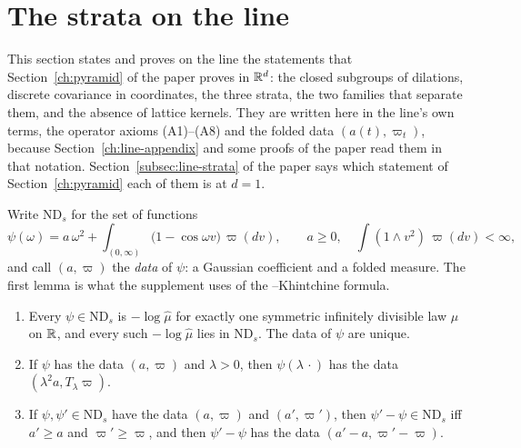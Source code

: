 \section{The strata on the line}
\label{supp:strata}

This section states and proves on the line the statements that Section~\ref{ch:pyramid} of the
paper proves in $\mathbb{R}^d$: the closed subgroups of dilations, discrete covariance in \Levy{}
coordinates, the three strata, the two families that separate them, and the absence of lattice
kernels. They are written here in the line's own terms, the operator axioms (A1)--(A8) and the
folded data $(a(t), \varpi_t)$, because Section~\ref{ch:line-appendix} and some proofs of the paper
read them in that notation. Section~\ref{subsec:line-strata} of the paper says which statement of
Section~\ref{ch:pyramid} each of them is at $d = 1$.

Write $\mathrm{ND}_s$ for the set of functions
\[
  \psi(\omega) = a\,\omega^2 + \int_{(0,\infty)}\bigl(1 - \cos\omega v\bigr)\,\varpi(dv), \qquad
  a \ge 0, \quad \int(1 \wedge v^2)\,\varpi(dv) < \infty ,
\]
and call $(a, \varpi)$ the \emph{data} of $\psi$: a Gaussian coefficient and a folded \Levy{}
measure. The first lemma is what the supplement uses of the \Levy{}--Khintchine formula.

\begin{lemma}
\label{lem:line-exponent-data}

\begin{enumerate}
\item Every $\psi \in \mathrm{ND}_s$ is $-\log\widehat\mu$ for exactly one symmetric infinitely
divisible law $\mu$ on $\mathbb{R}$, and every such $-\log\widehat\mu$ lies in $\mathrm{ND}_s$. The data of
$\psi$ are unique.
\item If $\psi$ has the data $(a, \varpi)$ and $\lambda > 0$, then $\psi(\lambda\,\cdot)$ has the
data $(\lambda^2a, T_\lambda\varpi)$.
\item If $\psi, \psi' \in \mathrm{ND}_s$ have the data $(a, \varpi)$ and $(a', \varpi')$, then
$\psi' - \psi \in \mathrm{ND}_s$ iff $a' \ge a$ and $\varpi' \ge \varpi$, and then $\psi' - \psi$
has the data $(a' - a, \varpi' - \varpi)$.
\end{enumerate}
\end{lemma}

